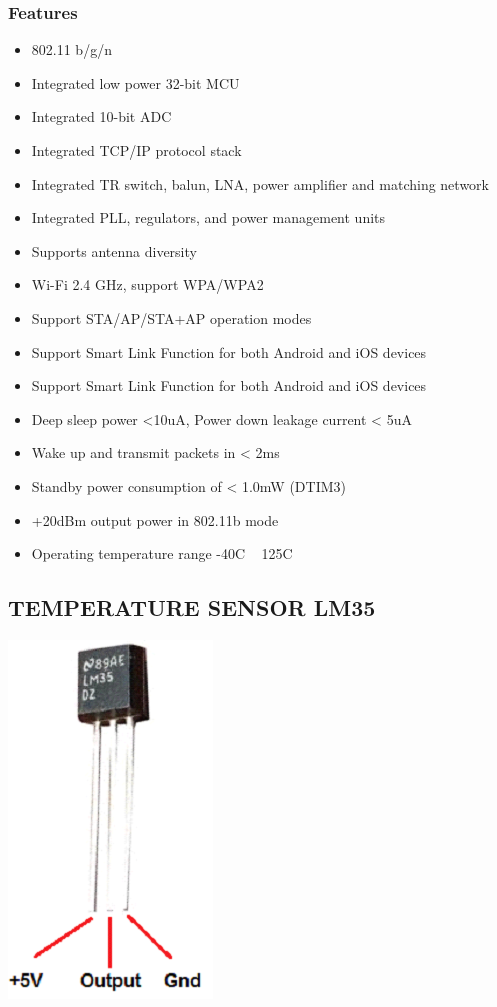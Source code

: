 \documentclass[12pt]{extarticle}
\numberwithin{figure}{section}
\begin{document}
\subsubsection{Features}
\begin{itemize}
\item 802.11 b/g/n
\item Integrated low power 32-bit MCU
\item Integrated 10-bit ADC
\item Integrated TCP/IP protocol stack
\item Integrated TR switch, balun, LNA, power amplifier and matching network
\item Integrated PLL, regulators, and power management units
\item Supports antenna diversity
\item Wi-Fi 2.4 GHz, support WPA/WPA2
\item Support STA/AP/STA+AP operation modes
\item Support Smart Link Function for both Android and iOS devices
\item Support Smart Link Function for both Android and iOS devices
\item Deep sleep power <10uA, Power down leakage current < 5uA
\item Wake up and transmit packets in < 2ms
\item Standby power consumption of < 1.0mW (DTIM3)
\item +20dBm output power in 802.11b mode
\item Operating temperature range -40C ~ 125C

\end{itemize}
\subsection{TEMPERATURE SENSOR LM35}
\begin{center}
\includegraphics[scale=1]{temp.png}
\end{center}
\end{document}
